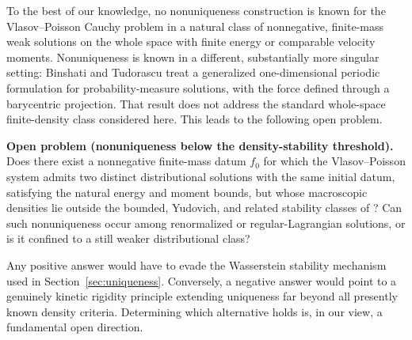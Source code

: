 \documentclass[11pt]{article}
\begin{document}
To the best of our knowledge, no nonuniqueness construction is known for the
Vlasov--Poisson Cauchy problem in a natural class of nonnegative, finite-mass
weak solutions  on the whole space  with finite energy or comparable velocity
moments.   Nonuniqueness is known in a different, substantially more singular
setting: Binshati and Tudorascu \cite{BinshatiTudorascu} treat a generalized
one-dimensional periodic formulation for probability-measure solutions,
with the force defined through a barycentric projection.  That result does
not address the standard whole-space finite-density class considered here.
 This leads to the following open problem.

\medskip
\noindent\textbf{Open problem (nonuniqueness below the density-stability
threshold).}
Does there exist a nonnegative finite-mass datum $f_0$ for which the
Vlasov--Poisson system admits two distinct distributional solutions with the
same initial datum, satisfying the natural energy and moment bounds, but
whose macroscopic densities lie outside the bounded, Yudovich, and related
stability classes of \cite{Loeper,Uniqueness,Yudovich}?  Can such
nonuniqueness occur among renormalized or regular-Lagrangian solutions, or is
it confined to a still weaker distributional class?

Any positive answer would have to evade the Wasserstein stability mechanism
used in Section~\ref{sec:uniqueness}.  Conversely, a negative answer would
point to a genuinely kinetic rigidity principle extending uniqueness far
beyond all presently known density criteria.  Determining which alternative
holds is, in our view, a fundamental open direction.
\end{document}
